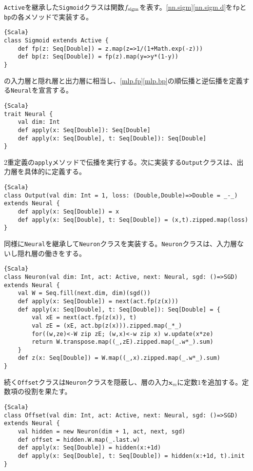 \documentclass[10pt,a4paper]{book}
\begin{document}
\texttt{Active}を継承した\texttt{Sigmoid}クラスは関数$f_\mathrm{sigm}$を表す。\eqref{nn.sigm}\eqref{nn.sigm.d}を\texttt{fp}と\texttt{bp}の各メソッドで実装する。

\begin{Verbatim}{Scala}
class Sigmoid extends Active {
	def fp(z: Seq[Double]) = z.map(z=>1/(1+Math.exp(-z)))
	def bp(z: Seq[Double]) = fp(z).map(y=>y*(1-y))
}
\end{Verbatim}

の入力層と隠れ層と出力層に相当し、\eqref{mlp.fp}\eqref{mlp.bp}の順伝播と逆伝播を定義する\texttt{Neural}を宣言する。

\begin{Verbatim}{Scala}
trait Neural {
	val dim: Int
	def apply(x: Seq[Double]): Seq[Double]
	def apply(x: Seq[Double], t: Seq[Double]): Seq[Double]
}
\end{Verbatim}

2重定義の\texttt{apply}メソッドで伝播を実行する。次に実装する\texttt{Output}クラスは、出力層を具体的に定義する。

\begin{Verbatim}{Scala}
class Output(val dim: Int = 1, loss: (Double,Double)=>Double = _-_) extends Neural {
	def apply(x: Seq[Double]) = x
	def apply(x: Seq[Double], t: Seq[Double]) = (x,t).zipped.map(loss)
}
\end{Verbatim}

同様に\texttt{Neural}を継承して\texttt{Neuron}クラスを実装する。\texttt{Neuron}クラスは、入力層ないし隠れ層の働きをする。

\begin{Verbatim}{Scala}
class Neuron(val dim: Int, act: Active, next: Neural, sgd: ()=>SGD) extends Neural {
	val W = Seq.fill(next.dim, dim)(sgd())
	def apply(x: Seq[Double]) = next(act.fp(z(x)))
	def apply(x: Seq[Double], t: Seq[Double]): Seq[Double] = {
		val xE = next(act.fp(z(x)), t)
		val zE = (xE, act.bp(z(x))).zipped.map(_*_)
		for((w,ze)<-W zip zE; (w,x)<-w zip x) w.update(x*ze)
		return W.transpose.map((_,zE).zipped.map(_.w*_).sum)
	}
	def z(x: Seq[Double]) = W.map((_,x).zipped.map(_.w*_).sum)
}
\end{Verbatim}

続く\texttt{Offset}クラスは\texttt{Neuron}クラスを隠蔽し、層の入力$\bm{x}_m$に定数$1$を追加する。定数項の役割を果たす。

\begin{Verbatim}{Scala}
class Offset(val dim: Int, act: Active, next: Neural, sgd: ()=>SGD) extends Neural {
	val hidden = new Neuron(dim + 1, act, next, sgd)
	def offset = hidden.W.map(_.last.w)
	def apply(x: Seq[Double]) = hidden(x:+1d)
	def apply(x: Seq[Double], t: Seq[Double]) = hidden(x:+1d, t).init
}
\end{Verbatim}
\end{document}
